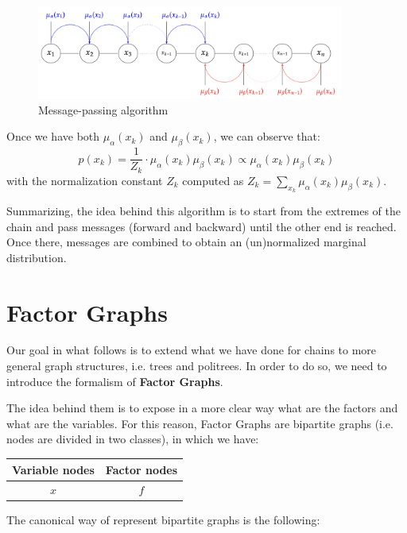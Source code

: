 \begin{figure}[H]
    \centering
    \includegraphics[width=0.9\textwidth]{assets/fig19.png}
    \caption{Message-passing algorithm}
\end{figure}

Once we have both $\mu_{\alpha}(x_k)$ and $\mu_{\beta}(x_k)$, we can observe that:
$$
    p(x_k) = \frac{1}{Z_k}\cdot \mu_{\alpha}(x_k)\mu_{\beta}(x_k) \propto \mu_{\alpha}(x_k)\mu_{\beta}(x_k)
$$
with the normalization constant $Z_k$ computed as $Z_k = \sum_{x_k}^{}\mu_{\alpha}(x_k)\mu_{\beta}(x_k)$.

Summarizing, the idea behind this algorithm is to start from the extremes of the chain and pass messages (forward and backward) until the other end is reached. Once there, messages are combined to obtain an (un)normalized marginal distribution.

\section{Factor Graphs}

Our goal in what follows is to extend what we have done for chains to more general graph structures, i.e. trees and politrees. In order to do so, we need to introduce the formalism of \textbf{Factor Graphs}.

The idea behind them is to expose in a more clear way what are the factors and what are the variables. For this reason, Factor Graphs are bipartite graphs (i.e. nodes are divided in two classes), in which we have:
\begin{table}[H]
    \centering
    \begin{tabular}{c|c}
        \textbf{Variable nodes} & \textbf{Factor nodes} \\
        \hline
        $x$ & $f$ \\

    \end{tabular}
\end{table}

The canonical way of represent bipartite graphs is the following:

